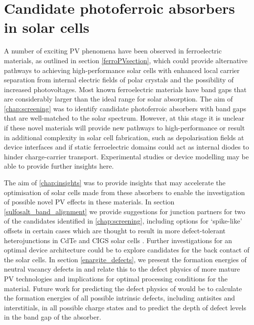 \documentclass[11pt, twoside]{report}
\begin{document}
\section{Candidate photoferroic absorbers in solar cells}
A number of exciting PV phenomena have been observed in ferroelectric materials, as outlined in section \ref{ferroPVsection}, which could provide alternative pathways to achieving high-performance solar cells with enhanced local carrier separation from internal electric fields of polar crystals and the possibility of increased photovoltages. Most known ferroelectric materials have band gaps that are considerably larger than the ideal range for solar absorption. The aim of \autoref{chap:screening} was to identify candidate photoferroic absorbers with band gaps that are well-matched to the solar spectrum.
However, at this stage it is unclear if these novel materials will provide new pathways to high-performance or result in additional complexity in solar cell fabrication, such as depolarisation fields at device interfaces \cite{FE-PV_kirchartz} and if static ferroelectric domains could act as internal diodes to hinder charge-carrier transport. Experimental studies or device modelling may be able to provide further insights here.

The aim of \autoref{chap:insights} was to provide insights that may accelerate the optimisation of solar cells made from these absorbers to enable the investigation of possible novel PV effects in these materials. In section \ref{sulfosalt_band_alignment} we provide suggestions for junction partners for two of the candidates identified in \autoref{chap:screening}, including options for `spike-like' offsets in certain cases which are thought to result in more defect-tolerant heterojunctions in CdTe and CIGS solar cells \cite{CdTe_spike, p-type_spike}. Further investigations for an optimal device architecture could be to explore candidates for the back contact of the solar cells.
In section \ref{enargite_defects}, we present the formation energies of neutral vacancy defects in {\enargite} and relate this to the defect physics of more mature PV technologies and implications for optimal processing conditions for the material. Future work for predicting the defect physics of {\enargite} would be to calculate the formation energies of all possible intrinsic defects, including antisites and interstitials, in all possible charge states and to predict the depth of defect levels in the band gap of the absorber.
\end{document}
